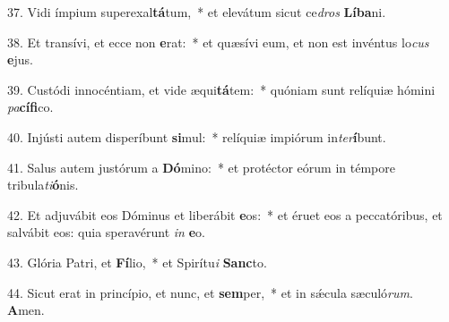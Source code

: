 37. Vidi ímpium superexal\textbf{tá}tum,~*  et elevátum sicut ce\textit{dros} \textbf{Lí}\textbf{ba}ni.\

38. Et transívi, et ecce non \textbf{e}rat:~*  et quæsívi eum, et non est invéntus lo\textit{cus} \textbf{e}jus.\

39. Custódi innocéntiam, et vide æqui\textbf{tá}tem:~*  quóniam sunt relíquiæ hómini \textit{pa}\textbf{cí}\textbf{fi}co.\

40. Injústi autem disperíbunt \textbf{si}mul:~*  relíquiæ impiórum in\textit{ter}\textbf{í}bunt.\

41. Salus autem justórum a \textbf{Dó}mino:~*  et protéctor eórum in témpore tribula\textit{ti}\textbf{ó}nis.\

42. Et adjuvábit eos Dóminus et liberábit \textbf{e}os:~*  et éruet eos a peccatóribus, et salvábit eos: quia speravérunt \textit{in} \textbf{e}o.\

43. Glória Patri, et \textbf{Fí}lio,~*  et Spirítu\textit{i} \textbf{Sanc}to.\

44. Sicut erat in princípio, et nunc, et \textbf{sem}per,~*  et in sǽcula sæculó\textit{rum}. \textbf{A}men.\

